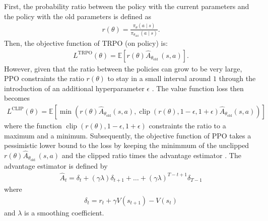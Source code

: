 First, the probability ratio between the policy with the current parameters and the policy with the old parameters is defined as
\begin{align*}
    r(\theta)=\frac{\pi_{\theta}(a \mid s)}{\pi_{\theta_{\text {old }}}(a \mid s)}.
\end{align*}
Then, the objective function of TRPO (on policy) is:
\begin{align*}
  L^{\mathrm{TRPO}}(\theta)=\mathbb{E}\left[r(\theta) \hat{A}_{\theta_{\text {old }}}(s, a)\right].
\end{align*}
However, given that the ratio between the policies can grow to be very large, PPO constraints the ratio $r(\theta)$ to stay in a small interval around $1$ through the introduction of an additional hyperparameter $\epsilon$ \cite{schulman2017proximal}. The value function loss then becomes
\begin{align*}
    L^{\mathrm{CLIP}}(\theta)=\mathbb{E}\left[\min \left(r(\theta) \hat{A}_{\theta_{\mathrm{old}}}(s, a), \operatorname{clip}(r(\theta), 1-\epsilon, 1+\epsilon) \hat{A}_{\theta_{\mathrm{old}}}(s, a)\right)\right]
\end{align*}
where the function $\operatorname{clip}(r(\theta), 1-\epsilon, 1+\epsilon)$ constraints the ratio to a maximum and a minimum. Subsequently, the objective function of PPO takes a pessimistic lower bound to the loss by keeping the minimmum of the unclipped $r(\theta) \hat{A}_{\theta_{\text {old }}}(s, a)$ and the clipped ratio times the advantage estimator \cite{schulman2017proximal}. The advantage estimator is defined by
\begin{align*}
  \hat{A}_{t}=\delta_{t}+(\gamma \lambda) \delta_{t+1}+\ldots+(\gamma \lambda)^{T-t+1} \delta_{T-1}
\end{align*}
where
\begin{align*}
  \delta_{t}=r_{t}+\gamma V(s_{t+1})-V(s_{t})
\end{align*}
and $\lambda$ is a smoothing coefficient. 
  

